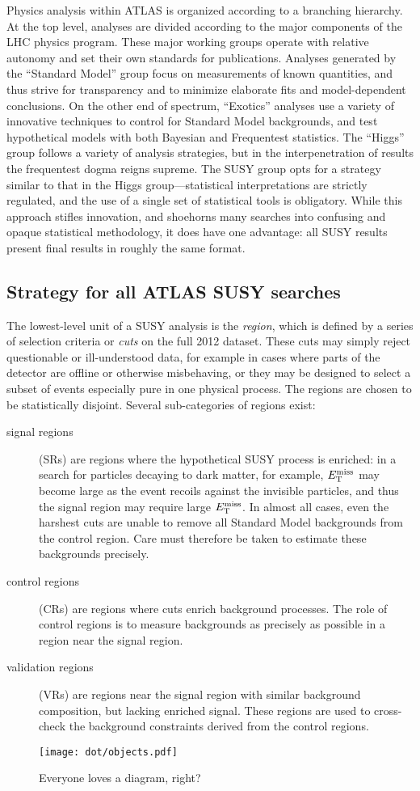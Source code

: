 
Physics analysis within ATLAS is organized according to a branching hierarchy. At the top level, analyses are divided according to the major components of the LHC physics program. These major working groups operate with relative autonomy and set their own standards for publications. Analyses generated by the ``Standard Model'' group focus on measurements of known quantities, and thus strive for transparency and to minimize elaborate fits and model-dependent conclusions. On the other end of spectrum, ``Exotics'' analyses use a variety of innovative techniques to control for Standard Model backgrounds, and test hypothetical models with both Bayesian and Frequentest statistics. The ``Higgs'' group follows a variety of analysis strategies, but in the interpenetration of results the frequentest dogma reigns supreme. The SUSY group opts for a strategy similar to that in the Higgs group---statistical interpretations are strictly regulated, and the use of a single set of statistical tools is obligatory. While this approach stifles innovation, and shoehorns many searches into confusing and opaque statistical methodology, it does have one advantage: all SUSY results present final results in roughly the same format.

\subsection{Strategy for all ATLAS SUSY searches}

The lowest-level unit of a SUSY analysis is the \emph{region}, which is defined by a series of selection criteria or \emph{cuts} on the full 2012 dataset. These cuts may simply reject questionable or ill-understood data, for example in cases where parts of the detector are offline or otherwise misbehaving, or they may be designed to select a subset of events especially pure in one physical process. The regions are chosen to be statistically disjoint. Several sub-categories of regions exist:
\begin{description}
\item[signal regions] (SRs) are regions where the hypothetical SUSY process is enriched: in a search for particles decaying to dark matter, for example, $E_{\rm T}^{\rm miss}$ may become large as the event recoils against the invisible particles, and thus the signal region may require large $E_{\rm T}^{\rm miss}$. In almost all cases, even the harshest cuts are unable to remove all Standard Model backgrounds from the control region. Care must therefore be taken to estimate these backgrounds precisely.
\item[control regions] (CRs) are regions where cuts enrich background processes. The role of control regions is to measure backgrounds as precisely as possible in a region near the signal region.
\item[validation regions] (VRs) are regions near the signal region with similar background composition, but lacking enriched signal. These regions are used to cross-check the background constraints derived from the control regions.
\end{description}

\begin{figure}[h]
  \begin{center}
    \texttt{[image: dot/objects.pdf]}
    \caption[Analysis Strategy]{Everyone loves a diagram, right?}
  \end{center}
\end{figure}
